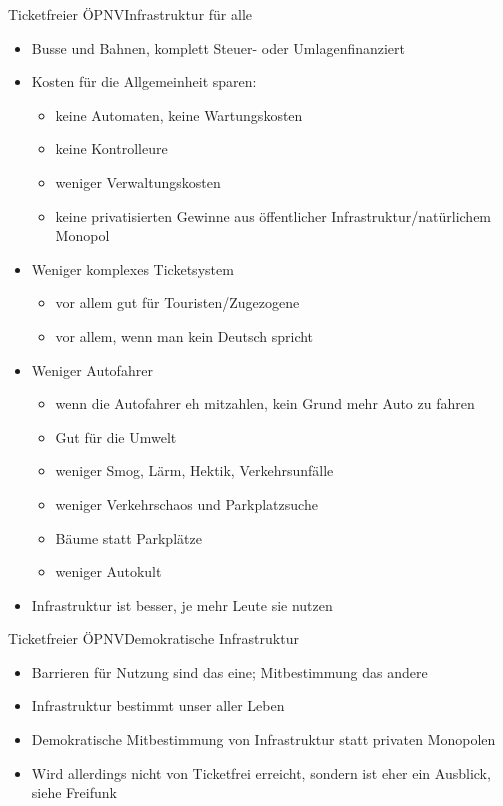 \documentclass[10pt]{beamer}
\begin{document}
{\begin{frame}{Ticketfreier ÖPNV}{Infrastruktur für alle}
  \begin{itemize}
    \item<1-> Busse und Bahnen, komplett Steuer- oder Umlagenfinanziert
    \item<1-> Kosten für die Allgemeinheit sparen:
    \begin{itemize}
    	\item<1-> keine Automaten, keine Wartungskosten
    	\item<1-> keine Kontrolleure
    	\item<1-> weniger Verwaltungskosten
    	\item<1-> keine privatisierten Gewinne aus öffentlicher Infrastruktur/natürlichem Monopol
    \end{itemize}
    \item<2-> Weniger komplexes Ticketsystem
    \begin{itemize}
    	\item<1-> vor allem gut für Touristen/Zugezogene
    	\item<1-> vor allem, wenn man kein Deutsch spricht
    \end{itemize}
    \item<3-> Weniger Autofahrer
    \begin{itemize}
    	\item<1-> wenn die Autofahrer eh mitzahlen, kein Grund mehr Auto zu fahren
    	\item<1-> Gut für die Umwelt
    	\item<1-> weniger Smog, Lärm, Hektik, Verkehrsunfälle
    	\item<1-> weniger Verkehrschaos und Parkplatzsuche
    	\item<1-> Bäume statt Parkplätze
    	\item<1-> weniger Autokult
    \end{itemize}
  	\item<4-> Infrastruktur ist besser, je mehr Leute sie nutzen
  \end{itemize}
\end{frame}

\begin{frame}{Ticketfreier ÖPNV}{Demokratische Infrastruktur}

\begin{itemize}
    \item<1-> Barrieren für Nutzung sind das eine; Mitbestimmung das andere
    \item<1-> Infrastruktur bestimmt unser aller Leben
    \item<1-> Demokratische Mitbestimmung von Infrastruktur statt privaten Monopolen
	\item<1-> Wird allerdings nicht von Ticketfrei erreicht, sondern ist eher ein Ausblick, siehe Freifunk
\end{itemize}
    


\end{frame}}
\end{document}
